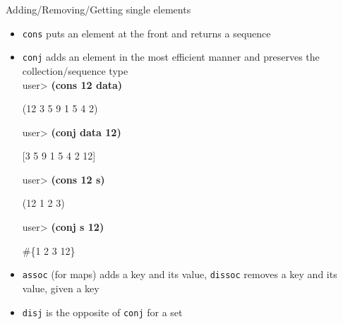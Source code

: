 \documentclass{beamer}
\begin{document}
\begin{frame}{Adding/Removing/Getting single elements}
  \begin{itemize}
  \item \texttt{cons} puts an element at the front and returns a
    sequence
  \item \texttt{conj} adds an element in the most efficient manner and
    preserves the collection/sequence type\\
{\ttfamily\color{black}
%
\textcolor[rgb]{0.49803922,0.0,0.49803922}{user{\textgreater}
}\textbf{(cons 12 data)}}

{\ttfamily\color{black}
(12 3 5 9 1 5 4 2)}

{\ttfamily\color{black}
\textcolor[rgb]{0.49803922,0.0,0.49803922}{user{\textgreater}
}\textbf{(conj data 12)}}

{\ttfamily\color{black}
[3 5 9 1 5 4 2 12]}

{\ttfamily\color{black}
\textcolor[rgb]{0.49803922,0.0,0.49803922}{user{\textgreater}
}\textbf{(cons 12 s)}}

{\ttfamily\color{black}
(12 1 2 3)}

{\ttfamily\color{black}
\textcolor[rgb]{0.49803922,0.0,0.49803922}{user{\textgreater}
}\textbf{(conj s 12)}}

{\ttfamily\color{black}
\#\{1 2 3 12\}}
  \item \texttt{assoc} (for maps) adds a key and its value, \texttt{dissoc}
    removes a key and its value, given a key\\
  \item \texttt{disj} is the opposite of \texttt{conj} for a set\\
  \end{itemize}
\end{frame}
\end{document}
